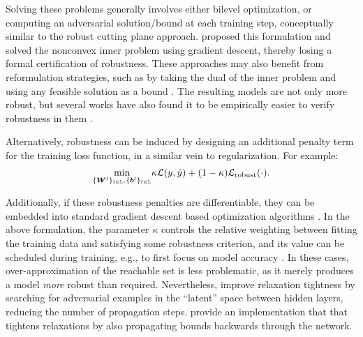 Solving these problems generally involves either bilevel optimization, or computing an adversarial solution/bound at each training step, conceptually similar to the robust cutting plane approach. 
\cite{madry2018towards} proposed this formulation and solved the nonconvex inner problem using gradient descent, thereby losing a formal certification of robustness. 
These approaches may also benefit from reformulation strategies, such as by taking the dual of the inner problem and using any feasible solution as a bound \citep{wong2018provable}. 
The resulting models are not only more robust, but several works have also found it to be empirically easier to verify robustness in them  \citep{mirman2018differentiable,wong2018provable}. 

Alternatively, robustness can be induced by designing an additional penalty term for the training loss function, in a similar vein to regularization. For example: 
\begin{equation*} 
\underset{\{ {\bm{W}}^l \}_{l \in {\mathbb{L}}}, \{ {\bm{b}}^l \}_{l \in {\mathbb{L}}}}{\mathrm{min}} \kappa \mathcal{L}(y,\hat{y}) + (1-\kappa) \mathcal{L}_\mathrm{robust}(\cdot).
\end{equation*}

Additionally, if these robustness penalties are differentiable, they can be embedded into standard gradient descent based optimization algorithms \citep{dvijotham2018dual,mirman2018differentiable}. 
In the above formulation, the parameter $\kappa$ controls the relative weighting between fitting the training data and satisfying some robustness criterion, and its value can be scheduled during training, e.g., to first focus on model accuracy \citep{gowal2018effectiveness}.
In these cases, over-approximation of the reachable set is less problematic, as it merely produces a model \emph{more} robust than required. 
Nevertheless, \cite{balunovic2020adversarial} improve relaxation tightness by searching for adversarial examples in the ``latent'' space between hidden layers, reducing the number of propagation steps. \cite{zhang2020towards} provide an implementation that that tightens relaxations by also propagating bounds backwards through the network. 



